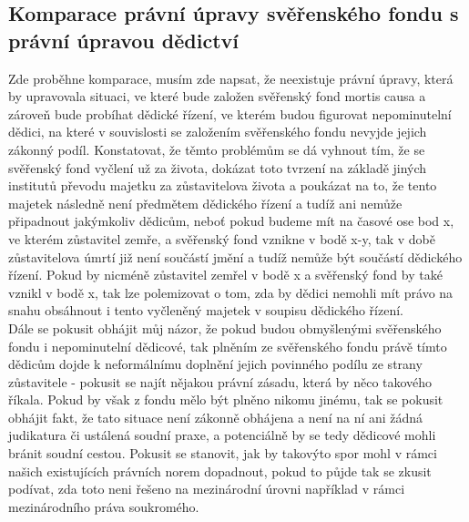 \documentclass{article}
\begin{document}



\newpage

\thispagestyle{smallertextinheader}

\subsection{Komparace právní úpravy svěřenského fondu s právní úpravou dědictví}

Zde proběhne komparace, musím zde napsat, že neexistuje právní úpravy, která by upravovala situaci, ve které bude založen svěřenský fond mortis causa a zároveň bude probíhat dědické řízení, ve kterém budou figurovat nepominutelní dědici, na které v souvislosti se založením svěřenského fondu nevyjde jejich zákonný podíl. Konstatovat, že těmto problémům se dá vyhnout tím, že se svěřenský fond vyčlení už za života, dokázat toto tvrzení na základě jiných institutů převodu majetku za zůstavitelova života a poukázat na to, že tento majetek následně není předmětem dědického řízení a tudíž ani nemůže připadnout jakýmkoliv dědicům, neboť pokud budeme mít na časové ose bod x, ve kterém zůstavitel zemře, a svěřenský fond vznikne v bodě x-y, tak v době zůstavitelova úmrtí již není součástí jmění a tudíž nemůže být součástí dědického řízení. Pokud by nicméně zůstavitel zemřel v bodě x a svěřenský fond by také vznikl v bodě x, tak lze polemizovat o tom, zda by dědici nemohli mít právo na snahu obsáhnout i tento vyčleněný majetek v soupisu dědického řízení.\\

Dále se pokusit obhájit můj názor, že pokud budou obmyšlenými svěřenského fondu i nepominutelní dědicové, tak plněním ze svěřenského fondu právě tímto dědicům dojde k neformálnímu doplnění jejich povinného podílu ze strany zůstavitele - pokusit se najít nějakou právní zásadu, která by něco takového říkala. Pokud by však z fondu mělo být plněno nikomu jinému, tak se pokusit obhájit fakt, že tato situace není zákonně obhájena a není na ní ani žádná judikatura či ustálená soudní praxe, a potenciálně by se tedy dědicové mohli bránit soudní cestou. Pokusit se stanovit, jak by takovýto spor mohl v rámci našich existujících právních norem dopadnout, pokud to půjde tak se zkusit podívat, zda toto neni řešeno na mezinárodní úrovni například v rámci mezinárodního práva soukromého. \\
\end{document}
